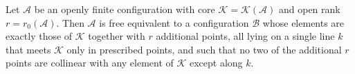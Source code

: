 Let $\mathcal{A}$ be an openly finite configuration with core $\mathcal{K} = \mathcal{K}(\mathcal{A})$ and open rank $r = r_0(\mathcal{A})$. Then $\mathcal{A}$ is free equivalent to a configuration $\mathcal{B}$ whose elements are exactly those of $\mathcal{K}$ together with $r$ additional points, all lying on a single line $k$ that meets $\mathcal{K}$ only in prescribed points, and such that no two of the additional $r$ points are collinear with any element of $\mathcal{K}$ except along $k$.
